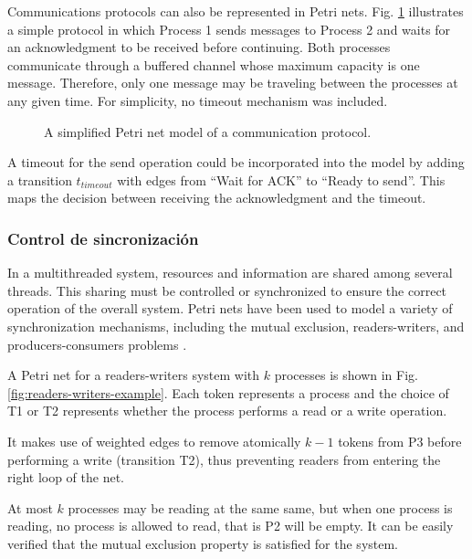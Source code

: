 Communications protocols can also be represented in Petri nets.
Fig. \ref{fig:communication-protocols-example} illustrates a simple protocol
in which Process 1 sends messages to Process 2 and
waits for an acknowledgment to be received before continuing.
Both processes communicate through a buffered channel whose maximum capacity is one message.
Therefore, only one message may be traveling between the processes at any given time.
For simplicity, no timeout mechanism was included.

\begin{figure}[!htbp]
      \centering
      
      \caption{A simplified Petri net model of a communication protocol.}
      \label{fig:communication-protocols-example}
\end{figure}

A timeout for the send operation could be incorporated into the model
by adding a transition $t_{timeout}$ with edges from ``Wait for ACK'' to ``Ready to send''.
This maps the decision between receiving the acknowledgment and the timeout.

\subsubsection{Control de sincronización}

In a multithreaded system, resources and information are shared among several threads.
This sharing must be controlled or synchronized
to ensure the correct operation of the overall system.
Petri nets have been used to model a variety of synchronization mechanisms,
including the mutual exclusion, readers-writers, and producers-consumers problems \cite{murata1989}.

A Petri net for a readers-writers system with $k$ processes
is shown in Fig. \ref{fig:readers-writers-example}.
Each token represents a process and the choice of T1 or T2
represents whether the process performs a read or a write operation.

It makes use of weighted edges to remove atomically
$k - 1$ tokens from P3 before performing a write (transition T2),
thus preventing readers from entering the right loop of the net.

At most $k$ processes may be reading at the same same,
but when one process is reading, no process is allowed to read, that is P2 will be empty.
It can be easily verified that the mutual exclusion property is satisfied for the system.

